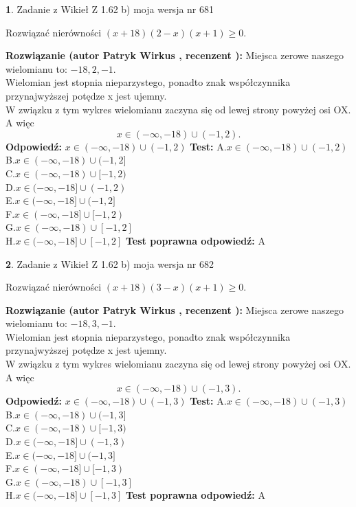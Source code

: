 \documentclass[12pt, a4paper]{article}
\theoremstyle{definition} %
\newtheorem{zad}{}
\newcommand{\zadStart}[1]{\begin{zad}#1\newline}
\newcommand{\zadStop}{\end{zad}}
\newcommand{\rozwStart}[2]{\noindent \textbf{Rozwiązanie (autor #1 , recenzent #2): }\newline}
\newcommand{\rozwStop}{\newline}
\newcommand{\odpStart}{\noindent \textbf{Odpowiedź:}\newline}
\newcommand{\odpStop}{\newline}
\newcommand{\testStart}{\noindent \textbf{Test:}\newline}
\newcommand{\testStop}{\newline}
\newcommand{\kluczStart}{\noindent \textbf{Test poprawna odpowiedź:}\newline}
\newcommand{\kluczStop}{\newline}
\begin{document}
\zadStart{Zadanie z Wikieł Z 1.62 b) moja wersja nr 681}

Rozwiązać nierówności $(x+18)(2-x)(x+1)\ge0$.
\zadStop
\rozwStart{Patryk Wirkus}{}
Miejsca zerowe naszego wielomianu to: $-18, 2, -1$.\\
Wielomian jest stopnia nieparzystego, ponadto znak współczynnika przy\linebreak najwyższej potędze x jest ujemny.\\ W związku z tym wykres wielomianu zaczyna się od lewej strony powyżej osi OX. A więc $$x \in (-\infty,-18) \cup (-1,2).$$
\rozwStop
\odpStart
$x \in (-\infty,-18) \cup (-1,2)$
\odpStop
\testStart
A.$x \in (-\infty,-18) \cup (-1,2)$\\
B.$x \in (-\infty,-18) \cup (-1,2]$\\
C.$x \in (-\infty,-18) \cup [-1,2)$\\
D.$x \in (-\infty,-18] \cup (-1,2)$\\
E.$x \in (-\infty,-18] \cup (-1,2]$\\
F.$x \in (-\infty,-18] \cup [-1,2)$\\
G.$x \in (-\infty,-18) \cup [-1,2]$\\
H.$x \in (-\infty,-18] \cup [-1,2]$
\testStop
\kluczStart
A
\kluczStop



\zadStart{Zadanie z Wikieł Z 1.62 b) moja wersja nr 682}

Rozwiązać nierówności $(x+18)(3-x)(x+1)\ge0$.
\zadStop
\rozwStart{Patryk Wirkus}{}
Miejsca zerowe naszego wielomianu to: $-18, 3, -1$.\\
Wielomian jest stopnia nieparzystego, ponadto znak współczynnika przy\linebreak najwyższej potędze x jest ujemny.\\ W związku z tym wykres wielomianu zaczyna się od lewej strony powyżej osi OX. A więc $$x \in (-\infty,-18) \cup (-1,3).$$
\rozwStop
\odpStart
$x \in (-\infty,-18) \cup (-1,3)$
\odpStop
\testStart
A.$x \in (-\infty,-18) \cup (-1,3)$\\
B.$x \in (-\infty,-18) \cup (-1,3]$\\
C.$x \in (-\infty,-18) \cup [-1,3)$\\
D.$x \in (-\infty,-18] \cup (-1,3)$\\
E.$x \in (-\infty,-18] \cup (-1,3]$\\
F.$x \in (-\infty,-18] \cup [-1,3)$\\
G.$x \in (-\infty,-18) \cup [-1,3]$\\
H.$x \in (-\infty,-18] \cup [-1,3]$
\testStop
\kluczStart
A
\kluczStop
\end{document}

